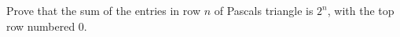 Prove that the sum of the entries in row $n$ of Pascal\textquotesingle s triangle is $2^n$, with the top row numbered $0$.
